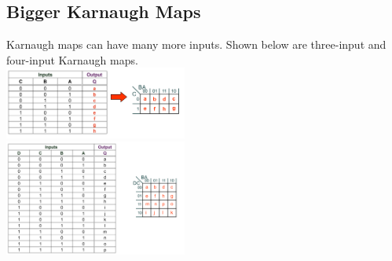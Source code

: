\documentclass[a4paper,11pt, twocolumn]{article}
\begin{document}
\subsection{Bigger Karnaugh Maps}
Karnaugh maps can have many more inputs. Shown below are three-input and four-input Karnaugh maps.\\
\includegraphics[width=0.45\textwidth]{kMaps CBA inp.PNG}\\
\includegraphics[width=0.45\textwidth]{kMaps DCBA inp.PNG}\\
\end{document}
